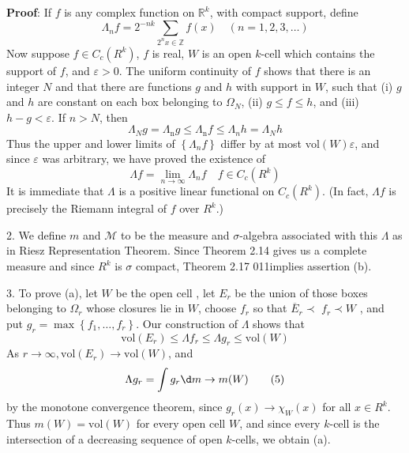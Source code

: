 \documentclass[12pt, a4paper, oneside]{book}
\begin{document}
\begin{theorem}
    \textbf{Proof}:
    If $f$ is any complex function on $\mathbb{R}^{k}$, with compact support, define
    \begin{equation}
        \Lambda_{n} f=2^{-n k} \sum_{2^n x \in \mathbb{Z}} f(x) \quad (n=1,2,3, \ldots) \tag{1}
    \end{equation}
    Now suppose $f \in C_{c}\left(R^{k}\right)$, $f$ is real, $W$ is an open $k$-cell which contains the support of $f$, and $\varepsilon>0$. The uniform continuity of $f$ shows that there is an integer $N$ and that there are functions $g$ and $h$ with support in $W$, such that (i) $g$ and $h$ are constant on each box belonging to $\Omega_{N}$, (ii) $g \leq f \leq h$, and (iii) $h-g<\varepsilon$. If $n>N$, then
    \begin{equation}
        \Lambda_{N} g=\Lambda_{\mathrm{n}} g \leq \Lambda_{\mathrm{n}} f \leq \Lambda_{n} h=\Lambda_{N} h \tag{2}
    \end{equation}
    Thus the upper and lower limits of $\left\{\Lambda_{n} f\right\}$ differ by at most $ \mathrm{vol}(W)\varepsilon$, and since $\varepsilon$ was arbitrary, we have proved the existence of
    \begin{equation}
        \Lambda f=\lim _{n \rightarrow \infty} \Lambda_{n} f \quad f \in C_{c}\left(R^{k}\right) \tag{3}
    \end{equation}
    It is immediate that $\Lambda$ is a positive linear functional on $C_{c}\left(R^{k}\right)$. (In fact, $\Lambda f$ is precisely the Riemann integral of $f$ over $R^{k}$.)

    2. We define $m$ and $\mathcal{M}$ to be the measure and $\sigma$-algebra associated with this $\Lambda$ as in Riesz Representation Theorem. Since Theorem 2.14 gives us a complete measure and since $R^{k}$ is $\sigma$ compact, Theorem 2.17 011implies assertion (b).

    3. To prove (a), let $W$ be the open cell , let $E_{r}$ be the union of those boxes belonging to $\Omega_{r}$ whose closures lie in $W$, choose $f_{r}$ so that
    $\overline{E}_{r}\prec$ $f_{r} \prec W$
    , and put $g_{r}=\max \left\{f_{1}, \ldots, f_{r}\right\}$. Our construction of $\Lambda$ shows that
    \begin{equation}
        \mathrm{vol}\left(E_{r}\right) \leq \Lambda f_{r} \leq \Lambda g_{r} \leq \mathrm{vol} (W) \tag{4}
    \end{equation}
    As $r \rightarrow \infty, \mathrm{vol}\left(E_{r}\right) \rightarrow \mathrm{vol}(W)$, and
    \begin{equation}
        \Lambda g_r=\int g_{r} \d  m \rightarrow m(W) \tag{5}
    \end{equation}
    by the monotone convergence theorem, since $g_{r}(x) \rightarrow \chi_{W}(x)$ for all $x \in R^{k}$. Thus $m(W)=\mathrm{vol}(W)$ for every open cell $W$, and since every $k$-cell is the intersection of a decreasing sequence of open $k$-cells, we obtain (a).


\end{theorem}
\end{document}
